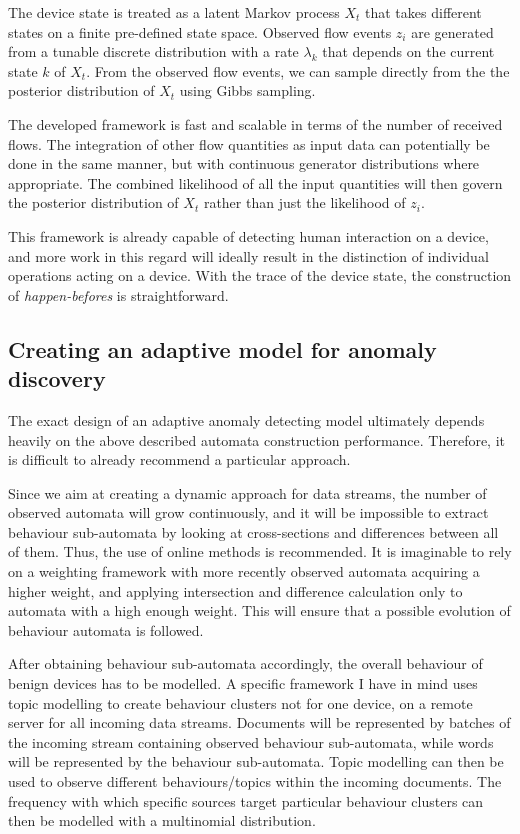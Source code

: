 \documentclass[11pt]{article}
\begin{document}
The device state is treated as a latent Markov process $X_t$ that takes different states on a finite pre-defined state space. Observed flow events $z_i$ are generated from a tunable discrete distribution with a rate $\lambda_k$ that depends on the current state $k$ of $X_t$. From the observed flow events, we can sample directly from the the posterior distribution of $X_t$ using Gibbs sampling. 

The developed framework is fast and scalable in terms of the number of received flows. The integration of other flow quantities as input data can potentially be done in the same manner, but with continuous generator distributions where appropriate. The combined likelihood of all the input quantities will then govern the posterior distribution of $X_t$ rather than just the likelihood of $z_i$.

This framework is already capable of detecting human interaction on a device, and more work in this regard will ideally result in the distinction of individual operations acting on a device. With the trace of the device state, the construction of \textit{happen-befores} is straightforward.  

\subsection{Creating an adaptive model for anomaly discovery}

The exact design of an adaptive anomaly detecting model ultimately depends heavily on the above described automata construction performance. Therefore, it is difficult to already recommend a particular approach. 

Since we aim at creating a dynamic approach for data streams, the number of observed automata will grow continuously, and it will be impossible to extract behaviour sub-automata by looking at cross-sections and differences between all of them. Thus, the use of online methods is recommended. It is imaginable to rely on a weighting framework with more recently observed automata acquiring a higher weight, and applying intersection and difference calculation only to automata with a high enough weight. This will ensure that a possible evolution of behaviour automata is followed.


After obtaining behaviour sub-automata accordingly, the overall behaviour of benign devices has to be modelled. A specific framework I have in mind uses topic modelling to create behaviour clusters not for one device, on a remote server for all incoming data streams. Documents will be represented by batches of the incoming stream containing observed behaviour sub-automata, while words will be represented by the behaviour sub-automata. Topic modelling can then be used to observe different behaviours/topics within the incoming documents. The frequency with which specific sources target particular behaviour clusters can then be modelled with a multinomial distribution.
\end{document}
